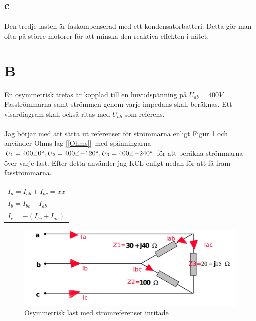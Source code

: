 \documentclass{article}
\begin{document}
\subsection{c}
Den tredje lasten är faskompenserad med ett kondensatorbatteri.
Detta gör man ofta på större motorer för att minska den reaktiva effekten i nätet.

\section{B}
  En osymmetrisk trefas är kopplad till en huvudspänning på $U_{ab}=400V$
  Fasströmmarna samt strömmen genom varje impedans skall beräknas.
  Ett visardiagram skall också ritas med $U_{ab}$ som referens.
  \\
  \\
  Jag börjar med att sätta ut referenser för strömmarna enligt Figur \ref{fig:osymm} och använder Ohms lag [\ref{Ohms}]\
   med spänningarna $U_1=400\angle{0\degree},U_2=400\angle{-120\degree},U_3=400\angle{-240\degree}$ för att beräkna strömmarna över varje last.
  Efter detta använder jag KCL enligt nedan för att få fram fasströmmarna.

  \begin{tabular}{| l}
    $I_a=I_{ab}+I_{ac}=xx$\\
    $I_b=I_{bc}-I_{ab}$\\
    $I_c=-(I_{bc}+I_{ac})$\\
  \end{tabular}

  \begin{figure}[H]
  \begin{center}
  \includegraphics[width=1\textwidth]{img/osymmetrisk-last1.jpg} %
  \caption{Osymmetrisk last med strömreferenser inritade}
  \label{fig:osymm}
  \end{center}
  \end{figure}
\end{document}
